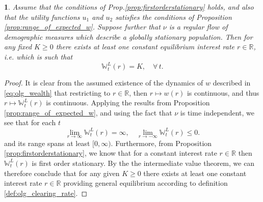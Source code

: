 \documentclass[11pt,oneside,english,reqno,dvipsnames,table]{amsart}
\numberwithin{equation}{section}
\theoremstyle{plain}
\newtheorem{thm}{\protect\theoremname}
\theoremstyle{definition}
\theoremstyle{remark}
\theoremstyle{plain}
\theoremstyle{plain}
\theoremstyle{plain}
\theoremstyle{plain}
\theoremstyle{plain}
\theoremstyle{plain}
\theoremstyle{plain}
\providecommand{\theoremname}{Theorem}
\newcommand{\blue}[1]{#1}
\newcommand{\RR}{\mathbb{R}}
\newcommand{\WW}{\mathbb{W}}
\numberwithin{thm}{section}
\begin{document}
\begin{thm}\label{th:olg_stationary_existence_crra}
     \blue{Assume that the conditions of Prop.\ref{prop:firstorderstationary} holds, and also that the utility functions $u_1$ and $u_2$ satisfies the conditions of Proposition \ref{prop:range_of_expected_w}}.  Suppose further that $\nu$ is a regular flow of demographic measures which describe a globally stationary population. Then for any fixed $K\geq 0$ there exists at least one constant equilibrium interest rate  $r\in \RR$, i.e. which is such that 
      \[ 
      \WW^L_t(r) = K,\quad \forall \,t. 
      \]
\end{thm}
\begin{proof}
 It is clear from the  assumed  existence of the dynamics of $w$ described in \eqref{eq:olg_wealth} that restricting to $r\in \RR$, then $r\mapsto w(r)$ is continuous, and thus $r\mapsto \WW_t^L(r)$ is continuous. 
Applying the results from Proposition \ref{prop:range_of_expected_w}, and using the fact that $\nu$ is time independent,  we see that for each $t$
\[
 \lim_{r\rightarrow \infty} \WW^L_t(r) = \infty, \quad \lim_{r\rightarrow -\infty} \WW^L_t(r)\leq 0. 
\]
 and its range spans at least $[0,\infty)$. Furthermore, from Proposition \ref{prop:firstorderstationary}, we know that for a constant interest rate $r\in \RR$ then $\WW^L_t(r)$ is first order stationary. By the the intermediate value theorem, we can therefore conclude that for any given $K\geq 0$ there exists at least one constant interest rate $r\in \RR$ providing general equilibrium according to definition \ref{def:olg_clearing_rate}. 
\end{proof}
\end{document}
